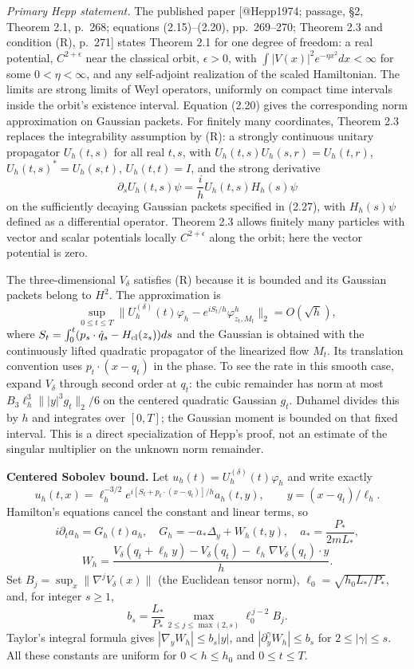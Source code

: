 \documentclass[11pt,a4paper]{article}
\begin{document}
\emph{Primary Hepp statement.} The published paper {[}@Hepp1974;
passage, §2, Theorem 2.1, p.~268; equations (2.15)--(2.20),
pp.~269--270; Theorem 2.3 and condition (R), p.~271{]} states Theorem
2.1 for one degree of freedom: a real potential, \(C^{2+\epsilon}\) near
the classical orbit, \(\epsilon>0\), with
\(\int |V(x)|^2e^{-\eta x^2}dx<\infty\) for some \(0<\eta<\infty\), and
any self-adjoint realization of the scaled Hamiltonian. The limits are
strong limits of Weyl operators, uniformly on compact time intervals
inside the orbit's existence interval. Equation (2.20) gives the
corresponding norm approximation on Gaussian packets. For finitely many
coordinates, Theorem 2.3 replaces the integrability assumption by (R): a
strongly continuous unitary propagator \(U_h(t,s)\) for all real
\(t,s\), with \(U_h(t,s)U_h(s,r)=U_h(t,r)\), \(U_h(t,s)^*=U_h(s,t)\),
\(U_h(t,t)=I\), and the strong derivative
\[\partial_s U_h(t,s)\psi=\frac ih U_h(t,s)H_h(s)\psi\] on the
sufficiently decaying Gaussian packets specified in (2.27), with
\(H_h(s)\psi\) defined as a differential operator. Theorem 2.3 allows
finitely many particles with vector and scalar potentials locally
\(C^{2+\epsilon}\) along the orbit; here the vector potential is zero.

The three-dimensional \(V_\delta\) satisfies (R) because it is bounded
and its Gaussian packets belong to \(H^2\). The approximation is
\[\sup_{0\le t\le T}\|U_h^{(\delta)}(t)\varphi_h
-e^{iS_t/h}\varphi^h_{z_t,M_t}\|_2=O(\sqrt h),\tag{4}\] where
\(S_t=\int_0^t(p_s\cdot\dot q_s-H_{\rm cl}(z_s))ds\) and the Gaussian is
obtained with the continuously lifted quadratic propagator of the
linearized flow \(M_t\). Its translation convention uses
\(p_t\cdot(x-q_t)\) in the phase. To see the rate in this smooth case,
expand \(V_\delta\) through second order at \(q_t\): the cubic remainder
has norm at most \(B_3\ell_h^3\||y|^3g_t\|_2/6\) on the centered
quadratic Gaussian \(g_t\). Duhamel divides this by \(h\) and integrates
over \([0,T]\); the Gaussian moment is bounded on that fixed interval.
This is a direct specialization of Hepp's proof, not an estimate of the
singular multiplier on the unknown norm remainder.

\textbf{Centered Sobolev bound.} Let
\(u_h(t)=U_h^{(\delta)}(t)\varphi_h\) and write exactly
\[u_h(t,x)=\ell_h^{-3/2}e^{i[S_t+p_t\cdot(x-q_t)]/h}a_h(t,y),
\qquad y=(x-q_t)/\ell_h.\] Hamilton's equations cancel the constant and
linear terms, so \[i\partial_ta_h=G_h(t)a_h,\quad
G_h=-a_*\Delta_y+W_h(t,y),\quad a_*=\frac{P_*}{2mL_*},\]
\[W_h=\frac{V_\delta(q_t+\ell_h y)-V_\delta(q_t)
-\ell_h\nabla V_\delta(q_t)\cdot y}{h}.\] Set
\(B_j=\sup_x\|\nabla^jV_\delta(x)\|\) (the Euclidean tensor norm),
\(\ell_0=\sqrt{h_0L_*/P_*}\), and, for integer \(s\ge1\),
\[b_s=\frac{L_*}{P_*}
\max_{2\le j\le\max(2,s)}\ell_0^{\,j-2}B_j.\] Taylor's integral formula
gives \(|\nabla_yW_h|\le b_s|y|\), and
\(|\partial_y^\gamma W_h|\le b_s\) for \(2\le|\gamma|\le s\). All these
constants are uniform for \(0<h\le h_0\) and \(0\le t\le T\).
\end{document}
